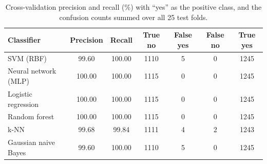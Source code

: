 \begin{table}[H]\centering\small
\caption{Cross-validation precision and recall (\%) with ``yes'' as the positive class, and the confusion counts summed over all 25 test folds.}\label{tab:pr}
\begin{tabular}{lcccccc}\toprule Classifier & Precision & Recall & True no & False yes & False no & True yes\\\midrule
SVM (RBF) & 99.60 & 100.00 & 1110 & 5 & 0 & 1245\\
Neural network (MLP) & 100.00 & 100.00 & 1115 & 0 & 0 & 1245\\
Logistic regression & 100.00 & 100.00 & 1115 & 0 & 0 & 1245\\
Random forest & 100.00 & 100.00 & 1115 & 0 & 0 & 1245\\
k-NN & 99.68 & 99.84 & 1111 & 4 & 2 & 1243\\
Gaussian naive Bayes & 99.60 & 100.00 & 1110 & 5 & 0 & 1245\\
\bottomrule\end{tabular}\end{table}
